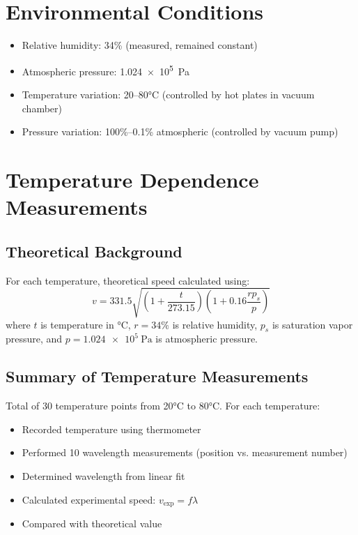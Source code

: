 \documentclass[12pt]{article}
\begin{document}
\section{Environmental Conditions}

\begin{itemize}
    \item Relative humidity: 34\% (measured, remained constant)
    \item Atmospheric pressure: \SI{1.024e5}{\pascal}
    \item Temperature variation: 20--80°C (controlled by hot plates in vacuum chamber)
    \item Pressure variation: 100\%--0.1\% atmospheric (controlled by vacuum pump)
\end{itemize}

\section{Temperature Dependence Measurements}

\subsection{Theoretical Background}

For each temperature, theoretical speed calculated using:
\begin{equation}
v = 331.5\sqrt{\left(1 + \frac{t}{273.15}\right)\left(1 + 0.16\frac{rp_s}{p}\right)}
\end{equation}
where $t$ is temperature in \si{\celsius}, $r = 34\%$ is relative humidity, $p_s$ is saturation vapor pressure, and $p = \SI{1.024e5}{\pascal}$ is atmospheric pressure.

\subsection{Summary of Temperature Measurements}

Total of 30 temperature points from 20°C to 80°C. For each temperature:
\begin{itemize}
    \item Recorded temperature using thermometer
    \item Performed 10 wavelength measurements (position vs. measurement number)
    \item Determined wavelength from linear fit
    \item Calculated experimental speed: $v_{\text{exp}} = f \lambda$
    \item Compared with theoretical value
\end{itemize}
\end{document}
